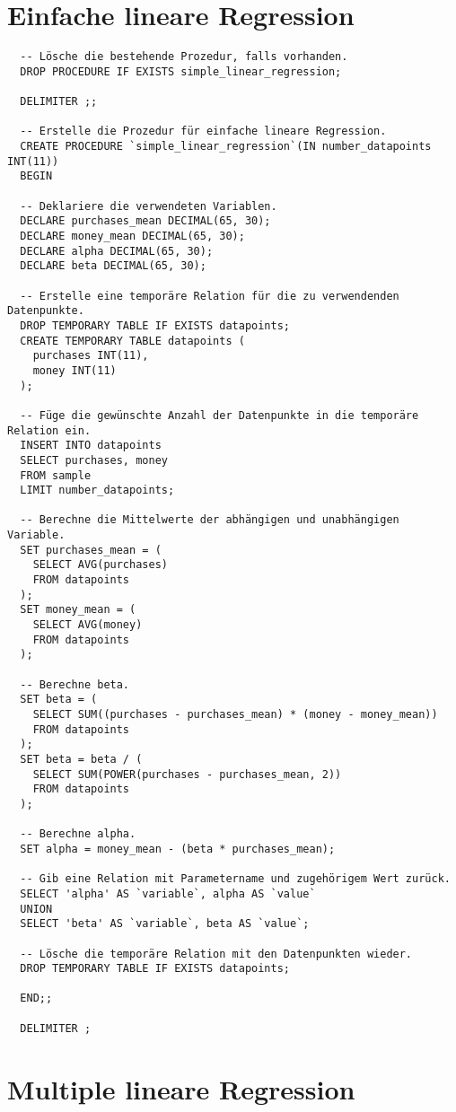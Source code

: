 \section{Einfache lineare Regression}
\label{appendix:D:1}

\begin{verbatim}
  -- Lösche die bestehende Prozedur, falls vorhanden.
  DROP PROCEDURE IF EXISTS simple_linear_regression;

  DELIMITER ;;

  -- Erstelle die Prozedur für einfache lineare Regression.
  CREATE PROCEDURE `simple_linear_regression`(IN number_datapoints INT(11))
  BEGIN

  -- Deklariere die verwendeten Variablen.
  DECLARE purchases_mean DECIMAL(65, 30);
  DECLARE money_mean DECIMAL(65, 30);
  DECLARE alpha DECIMAL(65, 30);
  DECLARE beta DECIMAL(65, 30);

  -- Erstelle eine temporäre Relation für die zu verwendenden Datenpunkte.
  DROP TEMPORARY TABLE IF EXISTS datapoints;
  CREATE TEMPORARY TABLE datapoints (
    purchases INT(11),
    money INT(11)
  );

  -- Füge die gewünschte Anzahl der Datenpunkte in die temporäre Relation ein.
  INSERT INTO datapoints
  SELECT purchases, money
  FROM sample
  LIMIT number_datapoints;

  -- Berechne die Mittelwerte der abhängigen und unabhängigen Variable.
  SET purchases_mean = (
    SELECT AVG(purchases)
    FROM datapoints
  );
  SET money_mean = (
    SELECT AVG(money)
    FROM datapoints
  );

  -- Berechne beta.
  SET beta = (
    SELECT SUM((purchases - purchases_mean) * (money - money_mean))
    FROM datapoints
  );
  SET beta = beta / (
    SELECT SUM(POWER(purchases - purchases_mean, 2))
    FROM datapoints
  );

  -- Berechne alpha.
  SET alpha = money_mean - (beta * purchases_mean);

  -- Gib eine Relation mit Parametername und zugehörigem Wert zurück.
  SELECT 'alpha' AS `variable`, alpha AS `value`
  UNION
  SELECT 'beta' AS `variable`, beta AS `value`;

  -- Lösche die temporäre Relation mit den Datenpunkten wieder.
  DROP TEMPORARY TABLE IF EXISTS datapoints;

  END;;

  DELIMITER ;
\end{verbatim}

\section{Multiple lineare Regression}
\label{appendix:D:2}

